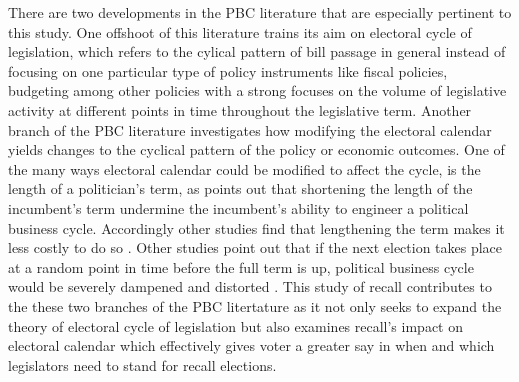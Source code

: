 \documentclass{article}
\begin{document}
		
		There are two developments in the PBC literature that are especially pertinent to this study.
		One offshoot of
		this
		literature
		trains its aim on
		electoral cycle of legislation,
		which refers to
		the cylical pattern of bill passage
		in general
		\autocite{lagonaOppositeCyclesLaws,
			lagonaPoliticalLegislationCycle2008,
			brechlerPoliticalLegislationCycle2014,
			wittmanMythDemocraticFailure1995}
		instead of focusing on one particular type of policy instruments
		like fiscal policies, budgeting among other policies
		with a strong focuses on
		the volume of legislative activity at different points in time
		throughout the legislative term.
		Another branch of the PBC literature investigates how
		modifying the electoral calendar
		yields changes to the cyclical pattern of the policy or economic outcomes.
		One of the many ways electoral calendar could be modified to affect the cycle,
		is the length of a politician's term,
		as
		\citeauthor{nordhausPoliticalBusinessCycle1975}
		\autocite*{nordhausPoliticalBusinessCycle1975}
		points out that shortening the length of the incumbent's term
		undermine the incumbent's ability to engineer a political business cycle.
		Accordingly other studies find that lengthening the term
		makes it less costly to do so
		\autocite
		{amacherCyclesSenatorialVoting1978,
			macraePoliticalModelBusiness1977}.
		Other studies
		point out that if the next election takes place
		at a random point in time before the full term is up,
		political business cycle would be severely dampened and distorted
		\autocite{ginsburghRandomTimingElections1983,lindbeckStabilizationPolicyOpen1976}.
		This
		study of recall contributes to the these two branches of the
		PBC
		litertature
		as it
		not only seeks to expand the theory
		of electoral cycle of legislation
		but also examines recall's impact on electoral calendar
		which effectively gives voter
		a greater say in when and which legislators
		need to stand for recall elections.
		
		
\end{document}
